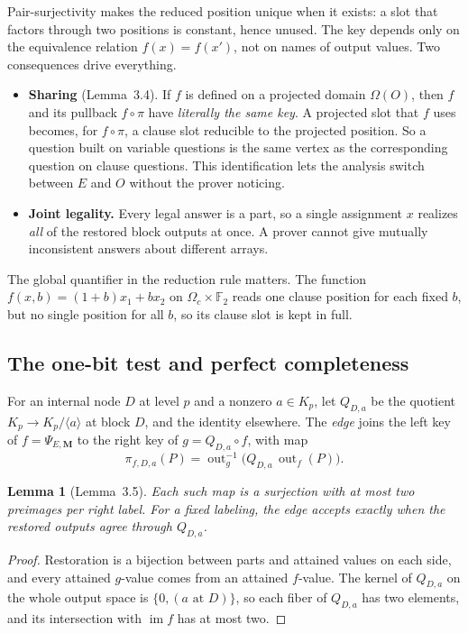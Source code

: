 \documentclass[11pt]{article}
\newtheorem{lemma}[theorem]{Lemma}
\theoremstyle{definition}
\theoremstyle{remark}
\DeclareMathOperator{\out}{out}
\newcommand{\Fb}{\mathbb F_2}
\begin{document}
Pair-surjectivity makes the reduced position unique when it exists: a slot
that factors through two positions is constant, hence unused. The key depends
only on the equivalence relation $f(x)=f(x')$, not on names of output values.
Two consequences drive everything.
\begin{itemize}
\item \textbf{Sharing} (Lemma~3.4). If $f$ is defined on a projected domain
$\Omega(O)$, then $f$ and its pullback $f\circ\pi$ have \emph{literally the
same key}. A projected slot that $f$ uses becomes, for $f\circ\pi$, a clause
slot reducible to the projected position. So a question built on variable
questions is the same vertex as the corresponding question on clause
questions. This identification lets the analysis switch between $E$ and $O$
without the prover noticing.
\item \textbf{Joint legality.} Every legal answer is a part, so a single
assignment $x$ realizes \emph{all} of the restored block outputs at once. A
prover cannot give mutually inconsistent answers about different arrays.
\end{itemize}

The global quantifier in the reduction rule matters. The function
$f(x,b)=(1+b)x_1+bx_2$ on $\Omega_c\times\Fb$ reads one clause position for each
fixed $b$, but no single position for all $b$, so its clause slot is kept in
full.

\subsection{The one-bit test and perfect completeness}

For an internal node $D$ at level $p$ and a nonzero $a\in K_p$, let $Q_{D,a}$ be
the quotient $K_p\to K_p/\langle a\rangle$ at block $D$, and the identity
elsewhere. The \emph{edge} joins the left key of $f=\Psi_{E,\mathbf M}$ to the
right key of $g=Q_{D,a}\circ f$, with map
\[
 \pi_{f,D,a}(P)=\out_g^{-1}\bigl(Q_{D,a}\,\out_f(P)\bigr).
\]

\begin{lemma}[Lemma~3.5]\label{lem:two-fibers}
Each such map is a surjection with at most two preimages per right label. For
a fixed labeling, the edge accepts exactly when the restored outputs agree
through $Q_{D,a}$.
\end{lemma}

\begin{proof}
Restoration is a bijection between parts and attained values on each side,
and every attained $g$-value comes from an attained $f$-value. The kernel of
$Q_{D,a}$ on the whole output space is $\{0,(a\text{ at }D)\}$, so each fiber
of $Q_{D,a}$ has two elements, and its intersection with $\operatorname{im}f$
has at most two.
\end{proof}
\end{document}
